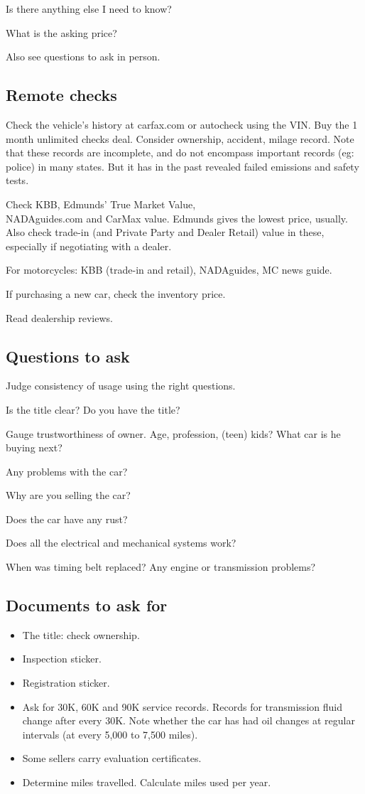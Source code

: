 \documentclass[oneside, article]{memoir}
\begin{document}
Is there anything else I need to know?

What is the asking price?

Also see questions to ask in person.

\subsection{Remote checks}

Check the vehicle's history at carfax.com or autocheck using the VIN. Buy the 1 month unlimited checks deal. Consider ownership, accident, milage record. Note that these records are incomplete, and do not encompass important records (eg: police) in many states. But it has in the past revealed failed emissions and safety tests.

Check KBB, Edmunds' True Market Value, \\
NADAguides.com and CarMax value. Edmunds gives the lowest price, usually. Also check trade-in (and Private Party and Dealer Retail) value in these, especially if negotiating with a dealer.

For motorcycles: KBB (trade-in and retail), NADAguides, MC news guide.

If purchasing a new car, check the inventory price.

Read dealership reviews.

\subsection{Questions to ask}

Judge consistency of usage using the right questions.

Is the title clear? Do you have the title?

Gauge trustworthiness of owner. Age, profession, (teen) kids? What car is he buying next?

Any problems with the car?

Why are you selling the car?

Does the car have any rust? 

Does all the electrical and mechanical systems work?

When was timing belt replaced? Any engine or transmission problems?

\subsection{Documents to ask for}
\begin{itemize}
\item The title: check ownership.
\item Inspection sticker.
\item Registration sticker.
\item Ask for 30K, 60K and 90K service records. Records for transmission fluid change after every 30K. Note whether the car has had oil changes at regular intervals (at every 5,000 to 7,500 miles).
\item Some sellers carry evaluation certificates.
\item Determine miles travelled. Calculate miles used per year.
\end{itemize}
\end{document}
